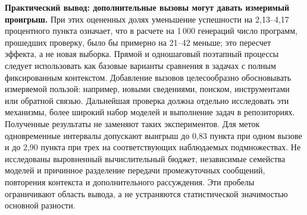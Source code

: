 \textbf{Практический вывод: дополнительные вызовы могут давать измеримый проигрыш.} При этих оцененных долях уменьшение успешности на 2,13--4,17 процентного пункта означает, что в расчете на 1\,000 генераций число программ, прошедших проверку, было бы примерно на 21--42 меньше; это пересчет эффекта, а не новая выборка. Прямой и одношаговый поэтапный процессы следует использовать как базовые варианты сравнения в задачах с полным фиксированным контекстом. Добавление вызовов целесообразно обосновывать измеряемой пользой: например, новыми сведениями, поиском, инструментами или обратной связью. Дальнейшая проверка должна отдельно исследовать эти механизмы, более широкий набор моделей и выполнение задач в репозиториях. Полученные результаты не заменяют таких экспериментов. Для меток одновременные интервалы допускают выигрыш до 0,83 пункта при одном вызове и до 2,90 пункта при трех на соответствующих наблюдаемых подмножествах. Не исследованы выровненный вычислительный бюджет, независимые семейства моделей и причинное разделение передачи промежуточных сообщений, повторения контекста и дополнительного рассуждения. Эти пробелы ограничивают область вывода, а не устраняются статистической значимостью основной разности.

\FloatBarrier
